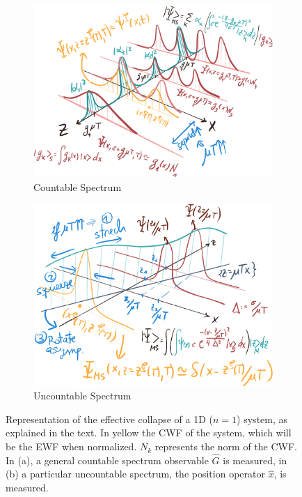 \documentclass[11pt, a4paper]{article} %
\begin{document}
\begin{figure}[h!]
  \centering
\begin{subfigure}[b]{0.47\linewidth}
    \includegraphics[width=\linewidth]{Figures/Countable.png}
    \caption{Countable Spectrum}
     \end{subfigure}
\begin{subfigure}[b]{0.46\linewidth}
    \includegraphics[width=\linewidth]{Figures/Uncountable.png}
    \caption{Uncountable Spectrum}
     \end{subfigure}
   \caption{Representation of the effective collapse of a 1D ($n=1$) system, as explained in the text. In yellow the CWF of the system, which will be the EWF when normalized. $N_k$ represents the norm of the CWF. In (a), a general countable spectrum observable $\hat{G}$ is measured, in (b) a particular uncountable spectrum, the position operator $\hat{x}$, is measured. }
  \label{fig:collapse}
\end{figure}
\end{document}
